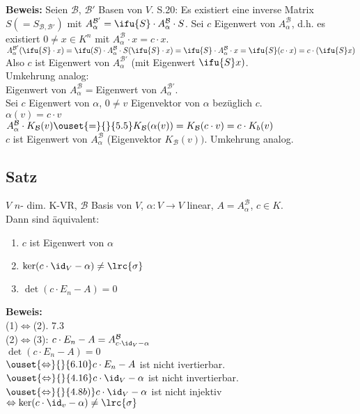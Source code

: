   \textbf{Beweis:} Seien ${\mathcal{B}}$, ${\mathcal{B}}'$ Basen von $V$. S.20:
  Es existiert eine inverse Matrix $S(=S_{\mathcal{B},\mathcal{B}'})$ mit
  $A_\alpha^{\mathcal{B}'}=\ifu{S}\cdot A_\alpha^{\mathcal{B}}\cdot S$. Sei $c$
  Eigenwert von $A_\alpha^{\mathcal{B}}$, d.h. es existiert $0\neq x\in K^n$ mit
  $A_\alpha^{\mathcal{B}}\cdot x=c\cdot x$.\\
  $A_\alpha^{\mathcal{B}'}(\ifu{S}\cdot x)=\ifu(S)\cdot
  A_\alpha^{\mathcal{B}}\cdot S(\ifu{S}\cdot x)=\ifu{S}\cdot
  A_\alpha^{\mathcal{B}}\cdot x=\ifu{S}(c\cdot x)=c\cdot(\ifu{S}x)$\\
  Also $c$ ist Eigenwert von $A_\alpha^{\mathcal{B}'}$ (mit Eigenwert
  $\ifu{S}x)$.\\
  Umkehrung analog:\\
  Eigenwert von $A_\alpha^{\mathcal{B}}=$Eigenwert von $A_\alpha^{\mathcal{B}'}$.\\
  Sei $c$ Eigenwert von $\alpha$, $0\neq v$ Eigenvektor von $\alpha$ bezüglich
  $c$.\\
  $\alpha(v)=c\cdot v$\\
  $A_\alpha^{\mathcal{B}}\cdot
  K_{\mathcal{B}}(v)\ouset{=}{}{5.5}K_{\mathcal{B}}(\alpha(v))=K_{\mathcal{B}}(c\cdot
  v)=c\cdot K_b(v)$\\
  $c$ ist Eigenwert von $A_\alpha^{\mathcal{B}}$ (Eigenvektor
  $K_{\mathcal{B}}(v))$. Umkehrung analog.

\subsection{Satz}
  $V$ $n$- dim. K-VR, $\mathcal{B}$ Basis von $V$, $\alpha:V\rightarrow V$ linear,
  $A=A_\alpha^{\mathcal{B}}$, $c\in K.$\\
  Dann sind äquivalent:
  \begin{enumerate}[(1)]
    \item $c$ ist Eigenwert von $\alpha$
    \item $\mbox{ker}(c\cdot\id_V-\alpha)\neq\lrc{\sigma}$
    \item $\det(c\cdot E_n-A)=0$
  \end{enumerate}

  \textbf{Beweis:}\\
  (1)$\Leftrightarrow$(2). 7.3\\
  (2)$\Leftrightarrow$(3): $c\cdot E_n-A=A_{c\cdot\id_V-\alpha}^{\mathcal{B}}$\\
  $\det(c\cdot E_n-A)=0$\\
  $\ouset{\Leftrightarrow}{}{6.10} c\cdot E_n-A$ ist nicht ivertierbar.\\
  $\ouset{\Leftrightarrow}{}{4.16} c\cdot\id_V-\alpha$ ist nicht invertierbar.\\
  $\ouset{\Leftrightarrow}{}{4.8b)} c\cdot\id_V-\alpha$ ist nicht injektiv\\
  $\Leftrightarrow \mbox{ker}(c\cdot\id_v-\alpha)\neq\lrc{\sigma}$

